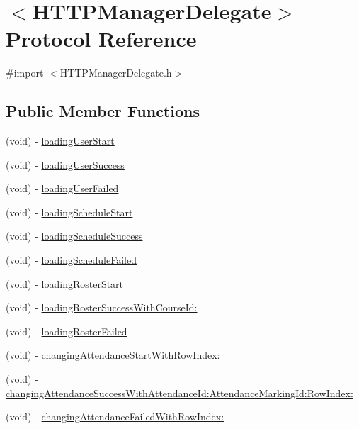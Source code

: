 \hypertarget{protocol_h_t_t_p_manager_delegate-p}{\section{$<$\-H\-T\-T\-P\-Manager\-Delegate$>$ \-Protocol \-Reference}
\label{protocol_h_t_t_p_manager_delegate-p}
}


{\ttfamily \#import $<$\-H\-T\-T\-P\-Manager\-Delegate.\-h$>$}

\subsection*{\-Public \-Member \-Functions}
\begin{DoxyCompactItemize}
\item 
(void) -\/ \hyperlink{protocol_h_t_t_p_manager_delegate-p_a15b7cbca7478eeeea8e44c30dec70363}{loading\-User\-Start}
\item 
(void) -\/ \hyperlink{protocol_h_t_t_p_manager_delegate-p_a7f019b4b16362379e19ac046fcf70d6f}{loading\-User\-Success}
\item 
(void) -\/ \hyperlink{protocol_h_t_t_p_manager_delegate-p_aa55180501fad2aaec7d5985aa7034cb9}{loading\-User\-Failed}
\item 
(void) -\/ \hyperlink{protocol_h_t_t_p_manager_delegate-p_a17aed3c940fab56be60086cd63dd857c}{loading\-Schedule\-Start}
\item 
(void) -\/ \hyperlink{protocol_h_t_t_p_manager_delegate-p_ad040e1934c0748b336972aa9a0e45921}{loading\-Schedule\-Success}
\item 
(void) -\/ \hyperlink{protocol_h_t_t_p_manager_delegate-p_a23da4326fa82d5b0b78715b73ff26d9e}{loading\-Schedule\-Failed}
\item 
(void) -\/ \hyperlink{protocol_h_t_t_p_manager_delegate-p_a603f6b04ea5070de1b2945e80d965ed8}{loading\-Roster\-Start}
\item 
(void) -\/ \hyperlink{protocol_h_t_t_p_manager_delegate-p_aaa059c990a4a9cf66a5ea7fdc47b1a5f}{loading\-Roster\-Success\-With\-Course\-Id\-:}
\item 
(void) -\/ \hyperlink{protocol_h_t_t_p_manager_delegate-p_a8cdbefac0e7ed477ab9b5a6e520869e7}{loading\-Roster\-Failed}
\item 
(void) -\/ \hyperlink{protocol_h_t_t_p_manager_delegate-p_a4527736a908629a83e8d7d94a072a0c6}{changing\-Attendance\-Start\-With\-Row\-Index\-:}
\item 
(void) -\/ \hyperlink{protocol_h_t_t_p_manager_delegate-p_ac7ed46d7973315bd0d6dbf46f4cd47f1}{changing\-Attendance\-Success\-With\-Attendance\-Id\-:\-Attendance\-Marking\-Id\-:\-Row\-Index\-:}
\item 
(void) -\/ \hyperlink{protocol_h_t_t_p_manager_delegate-p_a96a3021d728a65c8a95b404df164dbbd}{changing\-Attendance\-Failed\-With\-Row\-Index\-:}
\end{DoxyCompactItemize}


